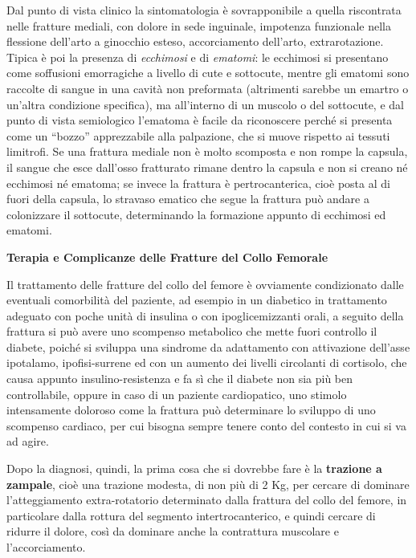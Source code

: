 \documentclass[]{article}
\begin{document}
Dal punto di vista clinico la sintomatologia è sovrapponibile a quella
riscontrata nelle fratture mediali, con dolore in sede inguinale,
impotenza funzionale nella flessione dell'arto a ginocchio esteso,
accorciamento dell'arto, extrarotazione. Tipica è poi la presenza di
\emph{ecchimosi} e di \emph{ematomi}: le ecchimosi si presentano come
soffusioni emorragiche a livello di cute e sottocute, mentre gli ematomi
sono raccolte di sangue in una cavità non preformata (altrimenti sarebbe
un emartro o un'altra condizione specifica), ma all'interno di un
muscolo o del sottocute, e dal punto di vista semiologico l'ematoma è
facile da riconoscere perché si presenta come un ``bozzo'' apprezzabile
alla palpazione, che si muove rispetto ai tessuti limitrofi. Se una
frattura mediale non è molto scomposta e non rompe la capsula, il sangue
che esce dall'osso fratturato rimane dentro la capsula e non si creano
né ecchimosi né ematoma; se invece la frattura è pertrocanterica, cioè
posta al di fuori della capsula, lo stravaso ematico che segue la
frattura può andare a colonizzare il sottocute, determinando la
formazione appunto di ecchimosi ed ematomi.

\textbf{Terapia e Complicanze delle Fratture del Collo Femorale}

Il trattamento delle fratture del collo del femore è ovviamente
condizionato dalle eventuali comorbilità del paziente, ad esempio in un
diabetico in trattamento adeguato con poche unità di insulina o con
ipoglicemizzanti orali, a seguito della frattura si può avere uno
scompenso metabolico che mette fuori controllo il diabete, poiché si
sviluppa una sindrome da adattamento con attivazione dell'asse
ipotalamo, ipofisi-surrene ed con un aumento dei livelli circolanti di
cortisolo, che causa appunto insulino-resistenza e fa sì che il diabete
non sia più ben controllabile, oppure in caso di un paziente
cardiopatico, uno stimolo intensamente doloroso come la frattura può
determinare lo sviluppo di uno scompenso cardiaco, per cui bisogna
sempre tenere conto del contesto in cui si va ad agire.

Dopo la diagnosi, quindi, la prima cosa che si dovrebbe fare è la
\textbf{trazione a zampale}, cioè una trazione modesta, di non più di 2
Kg, per cercare di dominare l'atteggiamento extra-rotatorio determinato
dalla frattura del collo del femore, in particolare dalla rottura del
segmento intertrocanterico, e quindi cercare di ridurre il dolore, così
da dominare anche la contrattura muscolare e l'accorciamento.
\end{document}

